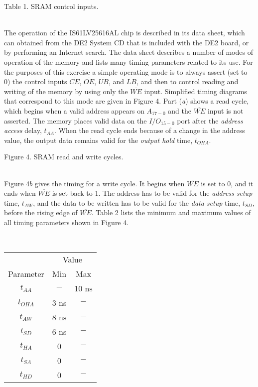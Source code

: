 \documentclass[psfig,10pt,fullpage]{article}
\begin{document}
\begin{center}
Table 1. SRAM control inputs.
\end{center}

~\\
\noindent
The operation of the IS61LV25616AL chip is described in its data sheet, which can obtained
from the DE2 System CD that is included with the DE2 board,
or by performing an Internet search. The data sheet describes a
number of modes of operation of the memory and lists many timing parameters related to
its use. For the purposes of this exercise a simple operating mode is to always assert
(set to 0) the control inputs 
$\overline{CE}$, $\overline{OE}$, $\overline{UB}$, and $\overline{LB}$,
and then to control reading and writing of the memory by using only the $\overline{WE}$
input. Simplified timing diagrams that correspond to this mode are given in Figure 4. 
Part ({\it a}) shows a read cycle, which begins when a valid address appears on 
$A_{17-0}$ and the $\overline{WE}$ input is not asserted. The memory places valid 
data on the $I/O_{15-0}$ port after the {\it address access} delay, $t_{AA}$. When 
the read cycle ends because of a change in
the address value, the output data remains valid for the {\it output hold} time, $t_{OHA}$.

\begin{figure}[H]
\scriptsize
\centerline{
\hbox{}}
\end{figure}
\centerline{Figure 4.  SRAM read and write cycles.}

~\\
Figure 4$b$ gives the timing for a write cycle. It begins when $\overline{WE}$ is set
to 0, and it ends when $\overline{WE}$ is set back to 1. The address has to be valid for
the {\it address setup} time, $t_{AW}$, and the data to be written has to be
valid for the {\it data setup} time, $t_{SD}$, before the rising edge of $\overline{WE}$.
Table 2 lists the minimum and maximum values of all timing parameters shown in Figure 4.

~\\
\begin{center}
\begin{tabular}{c|c c}
~ & \multicolumn{2}{c}{Value} \\
Parameter & Min & Max\\ \hline
\rule[-0.075in]{0in}{0.25in} $t_{AA}$ & $-$ & 10 ns\\ 
\rule[-0.075in]{0in}{0.25in} $t_{OHA}$ & 3 ns & $-$\\ 
\rule[-0.075in]{0in}{0.25in} $t_{AW}$ & 8 ns & $-$\\ 
\rule[-0.075in]{0in}{0.25in} $t_{SD}$ & 6 ns & $-$\\ 
\rule[-0.075in]{0in}{0.25in} $t_{HA}$ & 0 & $-$\\ 
\rule[-0.075in]{0in}{0.25in} $t_{SA}$ & 0 & $-$\\ 
\rule[-0.075in]{0in}{0.25in} $t_{HD}$ & 0 & $-$\\ 
\end{tabular}
\end{center}
\end{document}
